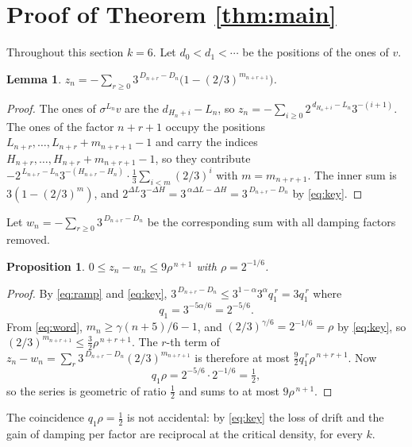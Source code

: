 \documentclass[11pt,a4paper]{article}
\theoremstyle{plain}
\newtheorem{proposition}[theorem]{Proposition}
\newtheorem{lemma}[theorem]{Lemma}
\theoremstyle{definition}
\newcommand{\al}{\alpha}
\newcommand{\ga}{\gamma}
\begin{document}
\section{Proof of Theorem \ref{thm:main}}\label{sec:proof}

Throughout this section $k=6$. Let $d_0<d_1<\cdots$ be the positions of the ones of $v$.

\begin{lemma}\label{lem:stage}
$\displaystyle z_n=-\sum_{r\ge0}3^{\,D_{n+r}-D_n}\Big(1-(2/3)^{m_{n+r+1}}\Big)$.
\end{lemma}

\begin{proof}
The ones of $\sigma^{L_n}v$ are the $d_{H_n+i}-L_n$, so
$z_n=-\sum_{i\ge0}2^{\,d_{H_n+i}-L_n}3^{-(i+1)}$. The ones of the factor $n+r+1$ occupy the
positions $L_{n+r},\dots,L_{n+r}+m_{n+r+1}-1$ and carry the indices
$H_{n+r},\dots,H_{n+r}+m_{n+r+1}-1$, so they contribute
$-2^{\,L_{n+r}-L_n}3^{-(H_{n+r}-H_n)}\cdot\tfrac13\sum_{i<m}(2/3)^i$ with $m=m_{n+r+1}$. The inner
sum is $3(1-(2/3)^m)$, and $2^{\Delta L}3^{-\Delta H}=3^{\,\al\Delta L-\Delta H}=3^{\,D_{n+r}-D_n}$
by \eqref{eq:key}.
\end{proof}

Let $w_n=-\sum_{r\ge0}3^{\,D_{n+r}-D_n}$ be the corresponding sum with all damping factors removed.

\begin{proposition}\label{prop:sat}
$0\le z_n-w_n\le 9\rho^{\,n+1}$ with $\rho=2^{-1/6}$.
\end{proposition}

\begin{proof}
By \eqref{eq:ramp} and \eqref{eq:key}, $3^{\,D_{n+r}-D_n}\le3^{1-\al}3^{\al}q_1^{\,r}=3q_1^{\,r}$
where
\begin{equation}\label{eq:q1}
  q_1=3^{-5\al/6}=2^{-5/6}.
\end{equation}
From \eqref{eq:word}, $m_n\ge\ga(n+5)/6-1$, and $(2/3)^{\ga/6}=2^{-1/6}=\rho$ by \eqref{eq:key}, so
$(2/3)^{m_{n+r+1}}\le\tfrac32\rho^{\,n+r+1}$. The $r$-th term of
$z_n-w_n=\sum_r3^{\,D_{n+r}-D_n}(2/3)^{m_{n+r+1}}$ is therefore at most
$\tfrac92q_1^{\,r}\rho^{\,n+r+1}$. Now
\[
   q_1\rho=2^{-5/6}\cdot2^{-1/6}=\tfrac12 ,
\]
so the series is geometric of ratio $\tfrac12$ and sums to at most $9\rho^{\,n+1}$.
\end{proof}

The coincidence $q_1\rho=\tfrac12$ is not accidental: by \eqref{eq:key} the loss of drift and the
gain of damping per factor are reciprocal at the critical density, for every $k$.
\end{document}
